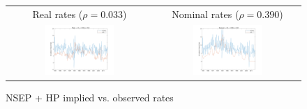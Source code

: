 \begin{figure}[h]
\ContinuedFloat
\centering
\begin{tabular}{cc}
Real rates ($\rho = 0.033$) & Nominal rates ($\rho = 0.390$) \\
\includegraphics[width=0.49\textwidth]{figs/nipa/implied-vs-ffr/real_nsep-hp} &
\includegraphics[width=0.49\textwidth]{figs/nipa/implied-vs-ffr/nominal_nsep-hp}
\end{tabular}
\caption{NSEP + HP implied vs. observed rates}
\end{figure}